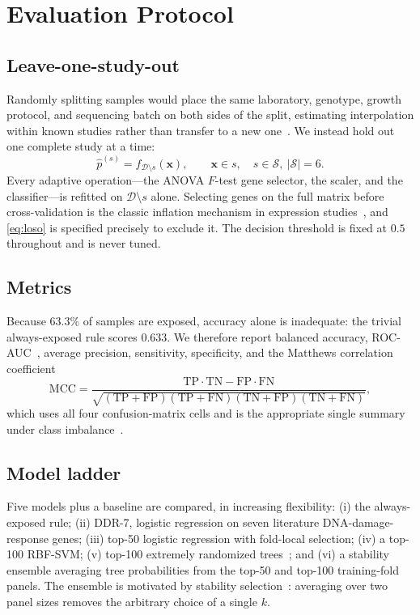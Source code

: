 \documentclass[manuscript,nonacm]{acmart}
\begin{document}
\section{Evaluation Protocol}

\subsection{Leave-one-study-out}
Randomly splitting samples would place the same laboratory, genotype, growth protocol,
and sequencing batch on both sides of the split, estimating interpolation within known
studies rather than transfer to a new one~\cite{steyerberg2016}. We instead hold out one
complete study at a time:
\begin{equation}
\hat{p}^{(s)} = f_{\mathcal{D}\setminus s}\!\left(\mathbf{x}\right),
\qquad \mathbf{x}\in s,\quad s\in\mathcal{S},\ |\mathcal{S}|=6 .
\label{eq:loso}
\end{equation}
Every adaptive operation---the ANOVA $F$-test gene selector, the scaler, and the
classifier---is refitted on $\mathcal{D}\setminus s$ alone. Selecting genes on the full
matrix before cross-validation is the classic inflation mechanism in expression
studies~\cite{ambroise2002}, and \cref{eq:loso} is specified precisely to exclude it.
The decision threshold is fixed at $0.5$ throughout and is never tuned.

\subsection{Metrics}
Because $63.3\%$ of samples are exposed, accuracy alone is inadequate: the trivial
always-exposed rule scores $0.633$. We therefore report balanced accuracy,
ROC-AUC~\cite{fawcett2006}, average precision, sensitivity, specificity, and the
Matthews correlation coefficient
\begin{equation}
\mathrm{MCC}=\frac{\mathrm{TP}\cdot\mathrm{TN}-\mathrm{FP}\cdot\mathrm{FN}}
{\sqrt{(\mathrm{TP}{+}\mathrm{FP})(\mathrm{TP}{+}\mathrm{FN})(\mathrm{TN}{+}\mathrm{FP})(\mathrm{TN}{+}\mathrm{FN})}},
\label{eq:mcc}
\end{equation}
which uses all four confusion-matrix cells and is the appropriate single summary under
class imbalance~\cite{chicco2020}.

\subsection{Model ladder}
Five models plus a baseline are compared, in increasing flexibility: (i) the
always-exposed rule; (ii) DDR-7, logistic regression on seven literature
DNA-damage-response genes; (iii) top-50 logistic regression with fold-local selection;
(iv) a top-100 RBF-SVM; (v) top-100 extremely randomized trees~\cite{geurts2006}; and
(vi) a stability ensemble averaging tree probabilities from the top-50 and top-100
training-fold panels. The ensemble is motivated by stability
selection~\cite{meinshausen2010}: averaging over two panel sizes removes the arbitrary
choice of a single $k$.
\end{document}
